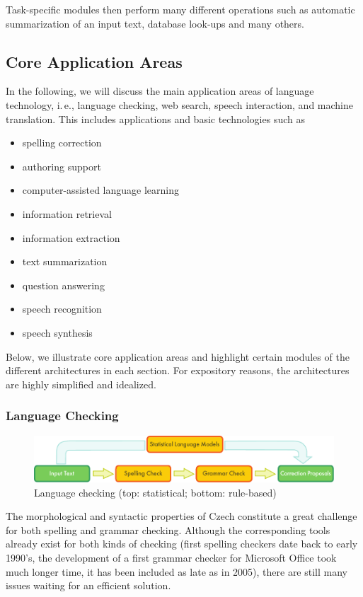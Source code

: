 \begin{multicols}{2}
Task-specific modules then perform many different operations such as automatic summarization of an input text, database look-ups and many others.
  
\subsection{Core Application Areas}
In the following, we will discuss the main application areas of language technology, i.\,e., language checking, web search, speech interaction, and machine translation. This includes applications and basic technologies such as

\begin{itemize}
\item spelling correction
\item authoring support
\item computer-assisted language learning
\item information retrieval
\item information extraction
\item text summarization
\item question answering
\item speech recognition
\item speech synthesis
\end{itemize}

Below, we illustrate core application areas and highlight certain modules of the different architectures in each section. For expository reasons, the architectures are highly simplified and idealized.

\subsubsection{Language Checking}

\begin{figure}[t]
  \center
  \includegraphics[width=\textwidth]{../_media/english/language_checking}
  \caption{Language checking (top: statistical; bottom: rule-based)}
\label{fig:langcheckingaarch_en}
\end{figure}

The morphological and syntactic properties of Czech constitute a great challenge for both spelling and grammar checking. Although the corresponding tools already exist for both kinds of checking (first spelling checkers date back to early 1990’s, the development of a first grammar checker for Microsoft Office took much longer time, it has been included as late as in 2005), there are still many issues waiting for an efficient solution.


\end{multicols}
